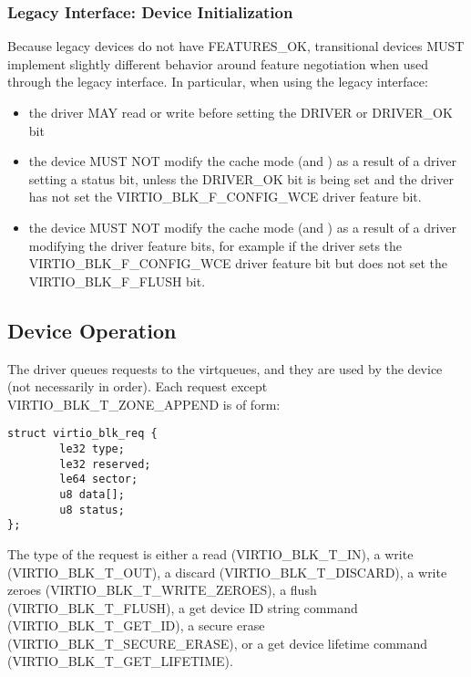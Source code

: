\subsubsection{Legacy Interface: Device Initialization}\label{sec:Device Types / Block Device / Device Initialization / Legacy Interface: Device Initialization}

Because legacy devices do not have FEATURES_OK, transitional devices
MUST implement slightly different behavior around feature negotiation
when used through the legacy interface.  In particular, when using the
legacy interface:

\begin{itemize}
\item the driver MAY read or write  before setting
  the DRIVER or DRIVER_OK  bit

\item the device MUST NOT modify the cache mode (and )
  as a result of a driver setting a status bit, unless
  the DRIVER_OK bit is being set and the driver has not set the
  VIRTIO_BLK_F_CONFIG_WCE driver feature bit.

\item the device MUST NOT modify the cache mode (and )
  as a result of a driver modifying the driver feature bits, for example
  if the driver sets the VIRTIO_BLK_F_CONFIG_WCE driver feature bit but
  does not set the VIRTIO_BLK_F_FLUSH bit.
\end{itemize}


\subsection{Device Operation}\label{sec:Device Types / Block Device / Device Operation}

The driver queues requests to the virtqueues, and they are used by
the device (not necessarily in order). Each request except
VIRTIO_BLK_T_ZONE_APPEND is of form:

\begin{lstlisting}
struct virtio_blk_req {
        le32 type;
        le32 reserved;
        le64 sector;
        u8 data[];
        u8 status;
};
\end{lstlisting}

The type of the request is either a read (VIRTIO_BLK_T_IN), a write
(VIRTIO_BLK_T_OUT), a discard (VIRTIO_BLK_T_DISCARD), a write zeroes
(VIRTIO_BLK_T_WRITE_ZEROES), a flush (VIRTIO_BLK_T_FLUSH), a get device ID
string command (VIRTIO_BLK_T_GET_ID), a secure erase
(VIRTIO_BLK_T_SECURE_ERASE), or a get device lifetime command
(VIRTIO_BLK_T_GET_LIFETIME).

